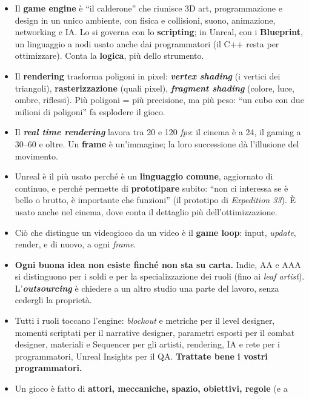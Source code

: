 \begin{itemize}
  \item Il \textbf{game engine} è ``il calderone'' che riunisce 3D art, programmazione e
        design in un unico ambiente, con fisica e collisioni, suono, animazione,
        networking e IA. Lo si governa con lo \textbf{scripting}; in Unreal, con i
        \textbf{Blueprint}, un linguaggio a nodi usato anche dai programmatori (il C++
        resta per ottimizzare). Conta la \textbf{logica}, più dello strumento.
  \item Il \textbf{rendering} trasforma poligoni in pixel: \textbf{\emph{vertex
        shading}} (i vertici dei triangoli), \textbf{rasterizzazione} (quali pixel),
        \textbf{\emph{fragment shading}} (colore, luce, ombre, riflessi). Più poligoni
        = più precisione, ma più peso: ``un cubo con due milioni di poligoni'' fa
        esplodere il gioco.
  \item Il \textbf{\emph{real time rendering}} lavora tra 20 e 120 \emph{fps}: il cinema
        è a 24, il gaming a 30--60 e oltre. Un \textbf{frame} è un'immagine; la loro
        successione dà l'illusione del movimento.
  \item Unreal è il più usato perché è un \textbf{linguaggio comune}, aggiornato di
        continuo, e perché permette di \textbf{prototipare} subito: ``non ci interessa
        se è bello o brutto, è importante che funzioni'' (il prototipo di
        \emph{Expedition 33}). È usato anche nel cinema, dove conta il dettaglio più
        dell'ottimizzazione.
  \item Ciò che distingue un videogioco da un video è il \textbf{game loop}: input,
        \emph{update}, render, e di nuovo, a ogni \emph{frame}.
  \item \textbf{Ogni buona idea non esiste finché non sta su carta.} Indie, AA e AAA si
        distinguono per i soldi e per la specializzazione dei ruoli (fino ai \emph{leaf
        artist}). L'\textbf{\emph{outsourcing}} è chiedere a un altro studio una parte
        del lavoro, senza cedergli la proprietà.
  \item Tutti i ruoli toccano l'engine: \emph{blockout} e metriche per il level
        designer, momenti scriptati per il narrative designer, parametri esposti per il
        combat designer, materiali e Sequencer per gli artisti, rendering, IA e rete per
        i programmatori, Unreal Insights per il QA. \textbf{Trattate bene i vostri
        programmatori.}
  \item Un gioco è fatto di \textbf{attori, meccaniche, spazio, obiettivi, regole} (e a

\end{itemize}
